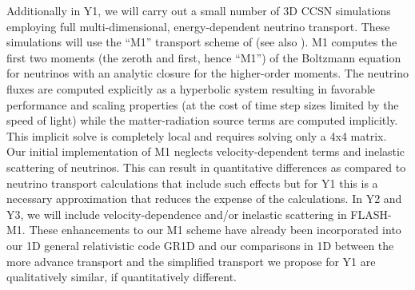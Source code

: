 Additionally in Y1, we will carry out a small number of 3D CCSN simulations employing full multi-dimensional, energy-dependent neutrino transport.
These simulations will use the ``M1'' transport scheme of \citet{OConnor:2013ja} (see also \citep{Kuroda:2012fv}).
M1 computes the first two moments (the zeroth and first, hence ``M1'') of the Boltzmann equation for neutrinos with an analytic closure for the higher-order moments.
The neutrino fluxes are computed explicitly as a hyperbolic system resulting in favorable performance and scaling properties (at the cost of time step sizes limited by the speed of light) while the matter-radiation source terms are computed implicitly.
This implicit solve is completely local and requires solving only a 4x4 matrix.
Our initial implementation of M1 neglects velocity-dependent terms and inelastic scattering of neutrinos.
This can result in quantitative differences as compared to neutrino transport calculations that include such effects \citep[see][]{Lentz:2012fy} but for Y1 this is a necessary approximation that reduces the expense of the calculations.
In Y2 and Y3, we will include velocity-dependence and/or inelastic scattering in FLASH-M1.
These enhancements to our M1 scheme have already been incorporated into our 1D general relativistic code GR1D and our comparisons in 1D between the more advance transport and the simplified transport we propose for Y1 are qualitatively similar, if quantitatively different.

